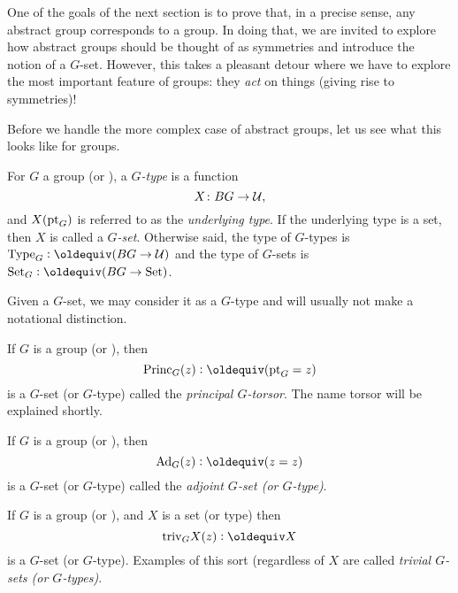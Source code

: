 One of the goals of the next section is to prove that, in a precise sense, any abstract group corresponds to a group.  In doing that, we are invited to explore how abstract groups should be thought of as symmetries and introduce the notion of a $G$-set.  However, this takes a pleasant detour where we have to explore the most important feature of groups: they \emph{act} on things (giving rise to symmetries)!

Before we handle the more complex case of abstract groups, let us see what this looks like for groups.

\begin{definition}
  For $G$ a group (or \inftygp), a \emph{$G$-type} is a function
  $$X\colon BG\to\mathcal{U},$$
and $X({\mathord{\mathrm{pt}}}_G)$ is referred to as the \emph{underlying type}.
If the underlying type is a set, then $X$ is called a \emph{$G$-set}.
Otherwise said, the type of $G$-types is $\Type_G\defequi(BG\to\UU)$ and the type of $G$-sets is $\Set_G\defequi(BG\to\Set)$.
\end{definition}
Given a $G$-set, we may consider it as a $G$-type and will usually not make a notational distinction.

\begin{example}\label{def:principaltorsor}
  If $G$ is a group (or \inftygp), then
$$\princ_G(z)\defequi(\pt_G=z)$$ is a $G$-set (or $G$-type) called the \emph{principal $G$-torsor}.  The name torsor will be explained shortly.
\end{example}

\newcommand{\Ad}{\mathrm{Ad}}
\begin{example}\label{def:adjointrep}
  If $G$ is a group (or \inftygp), then
$$\Ad_G(z)\defequi(z=z)$$ is a $G$-set (or $G$-type) called the \emph{adjoint $G$-set (or $G$-type)}.
\end{example}
\begin{example}\label{def:trivGset}
  If $G$ is a group (or \inftygp), and $X$ is a set (or type) then
$$\mathrm{triv}_GX(z)\defequi X$$ is a $G$-set (or $G$-type).  Examples of this sort (regardless of $X$ are called \emph{trivial $G$-sets (or $G$-types)}.
\end{example}

